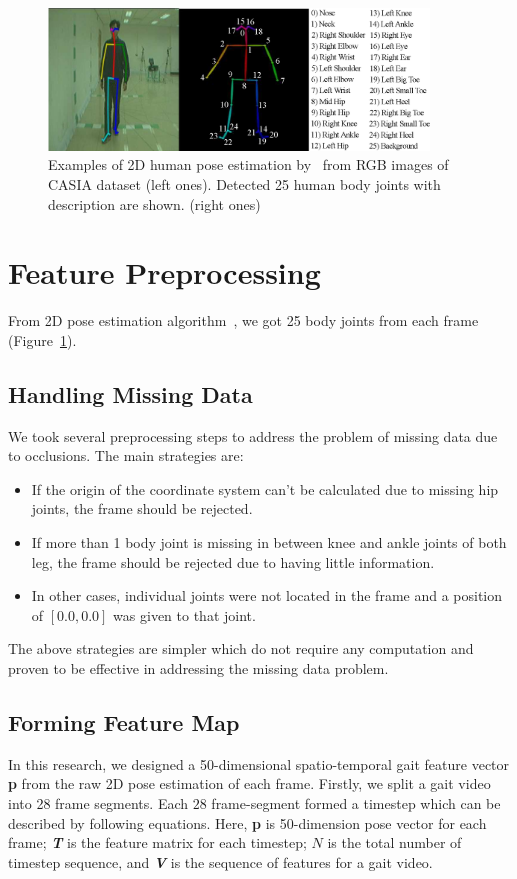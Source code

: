 \begin{figure}
	\centering 
	\includegraphics[width = 0.9\textwidth]{figures/pose_estimation.eps}
	\caption[Examples of 2D human pose estimation from RGB images of CASIA dataset]
	{Examples of 2D human pose estimation by~\cite{Cao_19} from RGB images of CASIA dataset (left ones). Detected 25 human body joints with description are shown. (right ones) \label{fig:pose_estimation}
	}
\end{figure}

\section{Feature Preprocessing}
From 2D pose estimation algorithm~\cite{Cao_19}, we got 25 body joints from each frame (Figure~\ref{fig:pose_estimation}). 

\subsection{Handling Missing Data}
We took several preprocessing steps to address the problem of missing data due to occlusions. The main strategies are: 
\begin{itemize}
\item If the origin of the coordinate system can't be calculated due to missing hip joints, the frame should be rejected.
\item If more than 1 body joint is missing in between knee and ankle joints of both leg, the frame should be rejected due to having little information.
\item In other cases, individual joints were not located in the frame and a position of $[0.0, 0.0]$  was given to that joint. 
\end{itemize}

The above strategies are simpler which do not require any computation and proven to be effective in addressing the missing data problem.

\subsection{Forming Feature Map}
In this research, we designed a 50-dimensional spatio-temporal gait feature vector \textbf{p} from the raw 2D pose estimation of each frame.  Firstly, we split a gait video into 28 frame segments. Each $ 28 $ frame-segment formed a timestep which can be described by following equations. Here, \textbf{p} is 50-dimension pose vector for each frame; \textit{\textbf{T}} is the feature matrix for each timestep; $ N $ is the total number of timestep sequence, and \textit{\textbf{V}} is the sequence of features for a gait video. 

